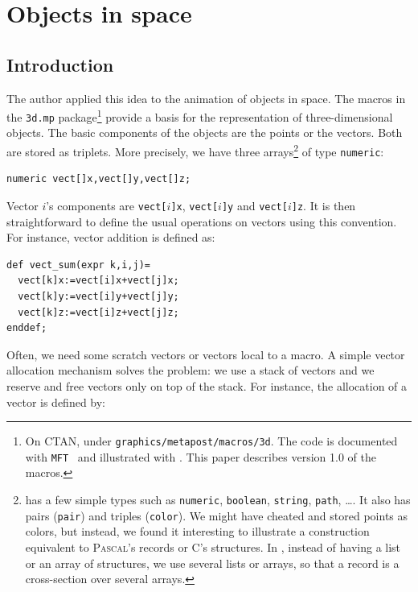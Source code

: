\documentclass[nonumber,harvardcite]{ltugboat}
\begin{document}
\section{Objects in space}

\subsection{Introduction}

The author applied this idea to the animation of objects
in space. The macros in the \texttt{3d.mp} package\footnote{On CTAN, 
under \texttt{graphics/metapost/macros/3d}. The code is documented
with \texttt{MFT}~\cite{knuth1989} 
and illustrated with \MP. This paper describes version 1.0 of the macros.} 
provide a basis for the
representation of three-dimensional objects. The basic components of
the objects are the points or the vectors. Both are stored as triplets.
More precisely, we have three 
arrays\footnote{\MP{} has a few simple types such as \texttt{numeric}, 
\texttt{boolean}, \texttt{string}, \texttt{path}, \ldots. 
It also has pairs (\texttt{pair}) and triples (\texttt{color}). We might
have cheated and stored points as colors, but instead, we found it
interesting to illustrate a construction equivalent
to \textsc{Pascal}'s records or C's structures. In \MP, instead of
having a list or an array of structures, we use several lists or arrays,
so that a record is a cross-section over several arrays.}
of type \verb|numeric|:

\begin{verbatim}
numeric vect[]x,vect[]y,vect[]z;
\end{verbatim} 

Vector $i$'s components are \verb|vect[|$i$\verb|]x|, \verb|vect[|$i$\verb|]y| 
and \verb|vect[|$i$\verb|]z|. It is then straightforward to define the usual
operations on vectors using this convention. For instance, 
vector addition is defined as:

\begin{verbatim}
def vect_sum(expr k,i,j)=
  vect[k]x:=vect[i]x+vect[j]x;
  vect[k]y:=vect[i]y+vect[j]y;
  vect[k]z:=vect[i]z+vect[j]z;
enddef;
\end{verbatim}

Often, we need some scratch vectors or vectors local to a macro.
A simple vector allocation mechanism solves the problem: we use a stack
of vectors and we reserve and free vectors only on top of the stack. 
For instance, the allocation of a vector is defined by:
\end{document}
